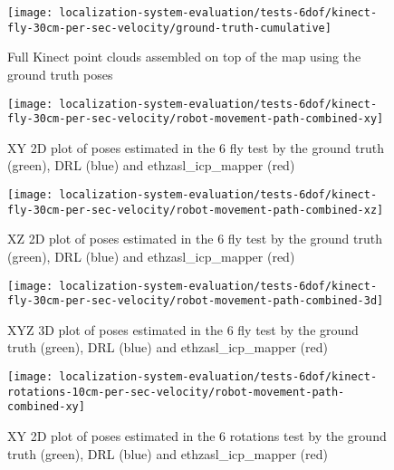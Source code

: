 \begin{figure}[H]
	\centering
	\texttt{[image: localization-system-evaluation/tests-6dof/kinect-fly-30cm-per-sec-velocity/ground-truth-cumulative]}
	\caption{Full Kinect point clouds assembled on top of the map using the ground truth poses}
	\label{fig:localization-system-evaluation_kinect-fly-30cm-per-sec-velocity-gt-cumulative}
\end{figure}


\begin{figure}[H]
	\centering
	\texttt{[image: localization-system-evaluation/tests-6dof/kinect-fly-30cm-per-sec-velocity/robot-movement-path-combined-xy]}
	\caption{XY 2D plot of poses estimated in the 6  fly test by the ground truth (green), DRL (blue) and ethzasl\_icp\_mapper (red)}
	\label{fig:localization-system-evaluation_kinect-fly-robot-movement-path-combined-xy}
\end{figure}

\begin{figure}[H]
	\centering
	\hspace*{0.25cm}\texttt{[image: localization-system-evaluation/tests-6dof/kinect-fly-30cm-per-sec-velocity/robot-movement-path-combined-xz]}
	\caption{XZ 2D plot of poses estimated in the 6  fly test by the ground truth (green), DRL (blue) and ethzasl\_icp\_mapper (red)}
	\label{fig:localization-system-evaluation_kinect-fly-robot-movement-path-combined-xz}
\end{figure}

\begin{figure}[H]
	\centering
	\texttt{[image: localization-system-evaluation/tests-6dof/kinect-fly-30cm-per-sec-velocity/robot-movement-path-combined-3d]}
	\caption{XYZ 3D plot of poses estimated in the 6  fly test by the ground truth (green), DRL (blue) and ethzasl\_icp\_mapper (red)}
	\label{fig:localization-system-evaluation_kinect-fly-robot-movement-path-combined-3d}
\end{figure}


\begin{figure}[H]
	\centering
	\texttt{[image: localization-system-evaluation/tests-6dof/kinect-rotations-10cm-per-sec-velocity/robot-movement-path-combined-xy]}
	\caption{XY 2D plot of poses estimated in the 6  rotations test by the ground truth (green), DRL (blue) and ethzasl\_icp\_mapper (red)}
	\label{fig:localization-system-evaluation_kinect-rotations-robot-movement-path-combined-xy}
\end{figure}

